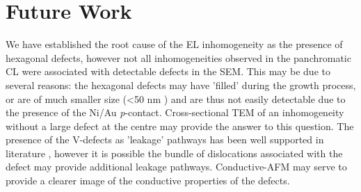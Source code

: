 \section{Future Work}
We have established the root cause of the EL inhomogeneity as the presence of hexagonal defects, however not all inhomogeneities observed in the panchromatic CL were associated with detectable defects in the SEM. This may be due to several reasons: the hexagonal defects may have 'filled' during the growth process, or are of much smaller size (<50 nm \cite{Oliver2006a,Tsai2007}) and are thus not easily detectable due to the presence of the Ni/Au \textit{p}-contact. Cross-sectional TEM of an inhomogeneity without a large defect at the centre may provide the answer to this question.
The presence of the V-defects as 'leakage' pathways has been well supported in literature \cite{Li2014,Quan2014}, however it is possible the bundle of dislocations associated with the defect may provide additional leakage pathways. Conductive-AFM may serve to provide a clearer image of the conductive properties of the defects.
